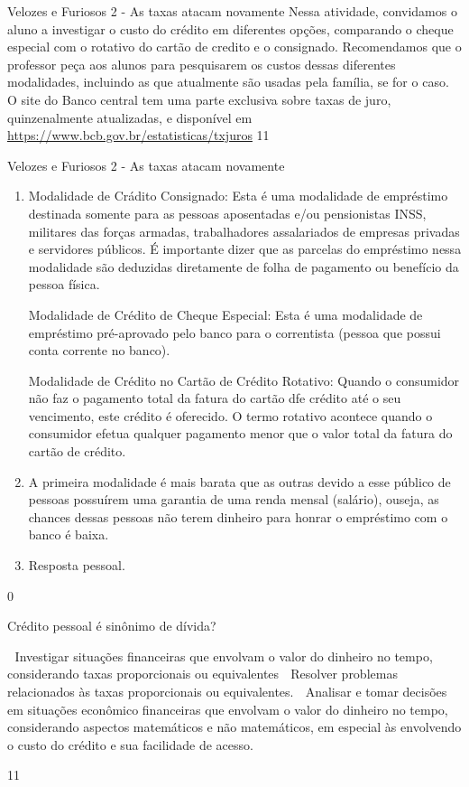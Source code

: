 \begin{sugestions}{Velozes e Furiosos 2 - As taxas atacam novamente}
{
Nessa atividade, convidamos o aluno a investigar o custo do crédito em diferentes opções, comparando o cheque especial com o rotativo do cartão de credito e o consignado. Recomendamos que o professor peça aos alunos para pesquisarem os custos dessas diferentes modalidades, incluindo as que atualmente são usadas pela família, se for o caso. O site do Banco central tem uma parte exclusiva sobre taxas de juro, quinzenalmente atualizadas, e disponível em \url{https://www.bcb.gov.br/estatisticas/txjuros}
}{1}{1}
\end{sugestions}
\begin{answer}{Velozes e Furiosos 2 - As taxas atacam novamente}
{
  \begin{enumerate}
    \item Modalidade de Crádito Consignado: Esta é uma modalidade de empréstimo destinada somente para as pessoas aposentadas e/ou pensionistas INSS, militares das forças armadas, trabalhadores assalariados de empresas privadas e servidores públicos. É importante dizer que as parcelas do empréstimo nessa modalidade são deduzidas diretamente de folha de pagamento ou benefício da pessoa física.

    Modalidade de Crédito de Cheque Especial: Esta é uma modalidade de empréstimo pré-aprovado pelo banco para o correntista (pessoa que possui conta corrente no banco).

    Modalidade de Crédito no Cartão de Crédito Rotativo: Quando o consumidor não faz o pagamento total da fatura do cartão dfe crédito até o seu vencimento, este crédito é oferecido. O termo rotativo acontece quando o consumidor efetua qualquer pagamento menor que o valor total da fatura do cartão de crédito.

    \item A primeira modalidade é mais barata que as outras devido a esse público de pessoas possuírem uma garantia de uma renda mensal (salário), ouseja, as chances dessas pessoas não terem dinheiro para honrar o empréstimo com o banco é baixa.

    \item Resposta pessoal.
  \end{enumerate}
}{0}
\end{answer}
\begin{objectives}{Crédito pessoal é sinônimo de dívida?}
{
 Investigar situações financeiras que envolvam o valor do dinheiro no tempo, considerando taxas proporcionais ou equivalentes
 Resolver problemas relacionados às taxas proporcionais ou equivalentes.
 Analisar e tomar decisões em situações econômico financeiras que envolvam o valor do dinheiro no tempo, considerando aspectos matemáticos e não matemáticos, em especial às envolvendo o custo do crédito e sua facilidade de acesso.

}{1}{1}
\end{objectives}
